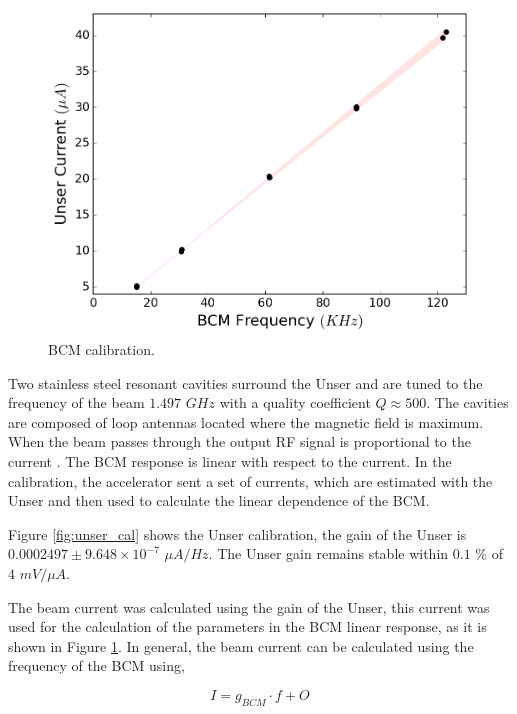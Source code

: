 \documentclass[final,5p,times,twocolumn]{elsarticle}
\begin{document}
\begin{figure}[htbp]
      \centering
    \includegraphics[width=\linewidth]{images/dnew_calibration.pdf}
    \caption{BCM calibration.}
    \label{fig:dnew_cal}
\end{figure}

Two stainless steel resonant cavities surround the Unser and are tuned to the frequency of the beam $1.497$ $GHz$ with a quality coefficient $Q \approx 500$.    The cavities are composed of loop antennas located where the magnetic field is maximum. When the beam passes through the output RF signal is proportional to the current \cite{denard}. The BCM response is linear with respect to the current. In the calibration, the accelerator sent a set of currents, which are estimated with the Unser and then used to calculate the linear dependence of the BCM.


Figure \ref{fig:unser_cal} shows the Unser calibration, the gain of the Unser is $0.0002497 \pm 9.648 \times 10^{-7} $ $\mu A/Hz$. The Unser gain remains stable within $0.1$ $\%$ of $4$ $mV/\mu A$. 

The beam current was calculated using the gain of the Unser, this current was used for the calculation of the parameters in the BCM linear response, as it is shown in Figure \ref{fig:dnew_cal}. In general, the beam current can be calculated using the frequency of the BCM using,

\begin{equation}
I = g_{BCM}\cdot f+O
\label{eq:current_calc}
\end{equation}
\end{document}
